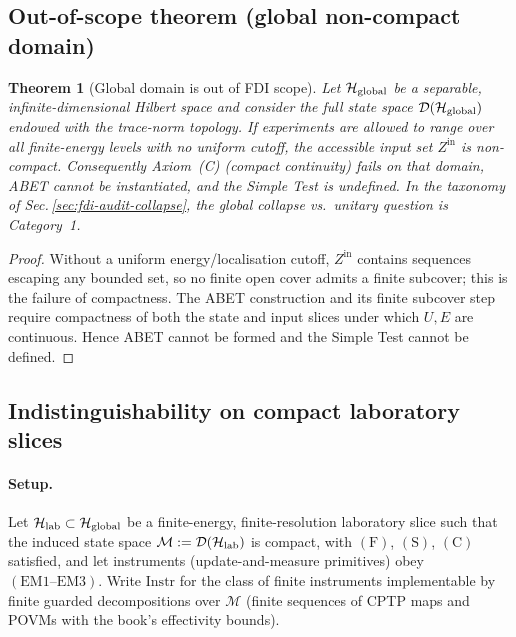 \documentclass[12pt]{article}
\theoremstyle{definition}
\theoremstyle{plain}
\newtheorem{theorem}{Theorem}[section]
\begin{document}
\subsection{Out-of-scope theorem (global non-compact domain)}
\label{subsec:global-out-of-scope}

\begin{theorem}[Global domain is out of FDI scope]\label{thm:global-out-of-scope}
Let $\mathcal H_{\rm global}$ be a separable, infinite-dimensional Hilbert space and consider the full state space $\mathcal D(\mathcal H_{\rm global})$ endowed with the trace-norm topology. If experiments are allowed to range over \emph{all} finite-energy levels with no uniform cutoff, the accessible input set $Z^{\mathrm{in}}$ is non-compact. Consequently Axiom~\textup{(C)} (compact continuity) fails on that domain, ABET cannot be instantiated, and the Simple Test is undefined. In the taxonomy of Sec.\,\ref{sec:fdi-audit-collapse}, the \emph{global} collapse vs.\ unitary question is Category~1.
\end{theorem}

\begin{proof}
Without a uniform energy/localisation cutoff, $Z^{\mathrm{in}}$ contains sequences escaping any bounded set, so no finite open cover admits a finite subcover; this is the failure of compactness. The ABET construction and its finite subcover step require compactness of both the state and input slices under which $U,E$ are continuous. Hence ABET cannot be formed and the Simple Test cannot be defined.
\end{proof}

\subsection{Indistinguishability on compact laboratory slices}
\label{subsec:global-indistinguishability}

\paragraph{Setup.} Let $\mathcal H_{\rm lab}\subset \mathcal H_{\rm global}$ be a finite-energy, finite-resolution laboratory slice such that the induced state space $\mathcal M:=\mathcal D(\mathcal H_{\rm lab})$ is compact, with $(\mathrm F)$, $(\mathrm S)$, $(\mathrm C)$ satisfied, and let instruments (update-and-measure primitives) obey $(\mathrm{EM1}\text{–}\mathrm{EM3})$. Write $\mathrm{Instr}$ for the class of finite instruments implementable by finite guarded decompositions over $\mathcal M$ (finite sequences of CPTP maps and POVMs with the book’s effectivity bounds).
\end{document}
